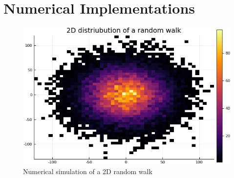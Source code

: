 \documentclass{article}
\theoremstyle{definition}
\theoremstyle{plain}
\theoremstyle{remark}
\begin{document}
\section{Numerical Implementations}
\begin{figure}
	\centering
	\includegraphics[width=.7\textwidth]{Code/Julia/Im/rw.png}
	\caption[2D simulation random walk]{Numerical simulation of a 2D random walk}
\end{figure}


\nocite{tuckerman2010statistical}
\nocite{perthame2015parabolic}
\nocite{salsa2016equazioni}
\printbibliography
\end{document}
